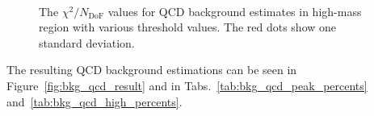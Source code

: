 \begin{figure}
{
 \\
\caption{The $\chi^2/N_\mathrm{DoF}$ values for QCD background estimates in high-mass region with various threshold values. The red dots show one standard deviation.}
\label{fig:qcd_high_chi}}
\end{figure}

The resulting QCD background estimations can be seen in Figure~\ref{fig:bkg_qcd_result} and in Tabs.~\ref{tab:bkg_qcd_peak_percents} and~\ref{tab:bkg_qcd_high_percents}.

\begin{figure}
\end{figure}

